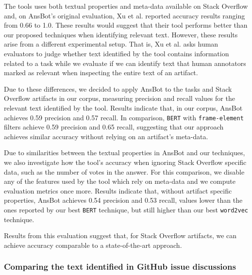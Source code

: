 The tools uses both textual properties and meta-data available on Stack Overflow and, 
on \acs{AnsBot}'s original evaluation, Xu et al. reported accuracy results ranging from 0.66 to 1.0. 
These results would suggest that their tool performs better than our proposed techniques when identifying relevant text.
However, these results arise from a different experimental setup. That is, Xu et al. asks human evaluators 
to judge whether text identified by the tool contains information related to a task
while we evaluate if we can identify text that human annotators 
marked as relevant when inspecting the entire text of an artifact.


Due to these differences, we decided to apply \acs{AnsBot} to the tasks and Stack Overflow artifacts in our corpus, 
measuring precision and recall values for the relevant text identified by the tool.
Results indicate that, in our corpus, \acs{AnsBot} achieves 0.59 precision and 0.57 recall. 
In comparison, \texttt{BERT} with \texttt{frame-element} filters achieve 0.59 precision and 0.65 recall,
suggesting that our approach achieves similar accuracy without relying on an artifact's meta-data.


Due to similarities between the textual properties in \acs{AnsBot}  and our techniques, 
we also investigate how the tool's accuracy when ignoring Stack Overflow specific data, such as the number of votes in the answer.
For this comparison, we disable any of the features used by the tool which rely on meta-data and
we compute evaluation metrics once more.
Results indicate that, without artifact specific properties, \acs{AnsBot} achieves 0.54 precision and 
0.53 recall, values lower than the ones reported by our best \texttt{BERT} technique, but still higher 
than our best \texttt{word2vec} technique.




Results from this evaluation suggest that, for Stack Overflow artifacts, we can achieve accuracy comparable  
to a state-of-the-art approach.





\subsubsection{Comparing the text identified in GitHub issue discussions}








